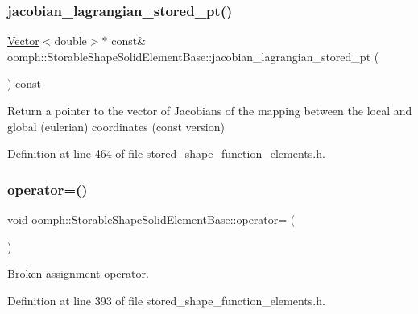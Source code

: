 \subsubsection{\texorpdfstring{jacobian\+\_\+lagrangian\+\_\+stored\+\_\+pt()}{jacobian\_lagrangian\_stored\_pt()}\hspace{0.1cm}{\footnotesize\ttfamily [2/2]}}
{\footnotesize\ttfamily \hyperlink{classoomph_1_1Vector}{Vector}$<$double$>$$\ast$ const\& oomph\+::\+Storable\+Shape\+Solid\+Element\+Base\+::jacobian\+\_\+lagrangian\+\_\+stored\+\_\+pt (\begin{DoxyParamCaption}{ }\end{DoxyParamCaption}) const\hspace{0.3cm}{\ttfamily [inline]}}



Return a pointer to the vector of Jacobians of the mapping between the local and global (eulerian) coordinates (const version) 



Definition at line 464 of file stored\+\_\+shape\+\_\+function\+\_\+elements.\+h.

\mbox{\label{classoomph_1_1StorableShapeSolidElementBase_a39120d36ee55497f58f4d31aebe2f0c9}} 
\subsubsection{\texorpdfstring{operator=()}{operator=()}}
{\footnotesize\ttfamily void oomph\+::\+Storable\+Shape\+Solid\+Element\+Base\+::operator= (\begin{DoxyParamCaption}\item[{const \hyperlink{classoomph_1_1StorableShapeSolidElementBase}{Storable\+Shape\+Solid\+Element\+Base} \&}]{ }\end{DoxyParamCaption})\hspace{0.3cm}{\ttfamily [inline]}}



Broken assignment operator. 



Definition at line 393 of file stored\+\_\+shape\+\_\+function\+\_\+elements.\+h.



